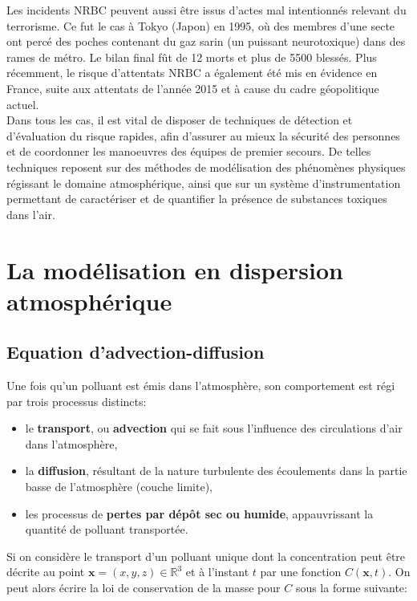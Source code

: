 	Les incidents NRBC peuvent aussi être issus d'actes mal intentionnés relevant du terrorisme. Ce fut le cas à Tokyo (Japon) en 1995, où des membres d'une secte ont percé des poches contenant du gaz sarin (un puissant neurotoxique) dans des rames de métro. Le bilan final fût  de 12 morts et plus de 5500 blessés. Plus récemment, le risque d'attentats NRBC a également été mis en évidence  en France, suite aux attentats de l'année 2015 et à cause du cadre géopolitique actuel.\\
	
	Dans tous les cas, il est vital de disposer de techniques de détection et d'évaluation du risque rapides, afin d'assurer au mieux la sécurité des personnes et de coordonner les manoeuvres des équipes de premier secours. De telles techniques reposent sur des méthodes de modélisation des phénomènes physiques régissant le domaine atmosphérique, ainsi que sur un système d'instrumentation permettant de caractériser et de quantifier la présence de substances toxiques dans l'air.\\


	\section{La modélisation en dispersion atmosphérique}
	
	\subsection{Equation d'advection-diffusion}
	
	Une fois qu'un polluant est émis dans l'atmosphère, son comportement est régi par trois processus distincts:\\
	\begin{itemize}
		\item le \textbf{transport}, ou \textbf{advection} qui se fait sous l'influence des circulations d'air dans l'atmosphère,
		\item la \textbf{diffusion}, résultant de la nature turbulente des écoulements dans la partie basse de l'atmosphère (couche limite),
		\item les processus de \textbf{pertes par dépôt sec ou humide}, appauvrissant la quantité de polluant transportée.\\
	\end{itemize}
	
	Si on considère le transport d'un polluant unique dont la concentration peut être décrite au point $\bm{x} = (x,y,z) \in \mathbb{R}^3$ et à l'instant $t$ par une fonction $C(\bm{x},t)$. On peut alors écrire la loi de conservation de la masse pour $C$ sous la forme suivante:\\
	
